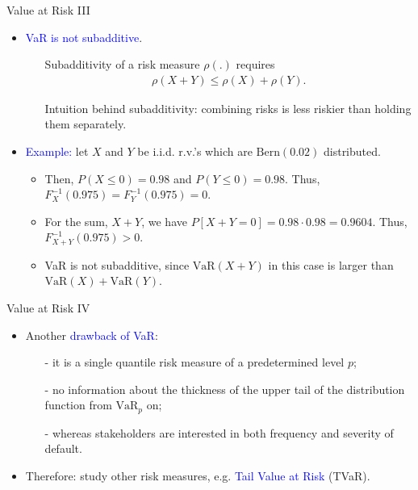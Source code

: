 \documentclass{beamer}
\begin{document}
\begin{frame}{Value at Risk III}
\begin{itemize}
\item \textcolor{blue}{VaR is not subadditive}.
\begin{itemize}
\item[] Subadditivity of a risk measure $\rho(.)$ requires
\begin{eqnarray*}
\rho(X+Y) \leq \rho(X)+\rho(Y).
\end{eqnarray*}
\item[] Intuition behind subadditivity: combining risks is less riskier than holding them separately.
\end{itemize}
\vspace{0.3cm}
\item \textcolor{blue}{Example:} let $X$ and $Y$ be i.i.d. r.v.'s which are $\text{Bern}(0.02)$ distributed.
\begin{itemize}
\item Then, $P(X\leq 0) = 0.98$ and $P(Y\leq 0)=0.98$. Thus, $F_X^{-1}(0.975)=F_Y^{-1}(0.975)=0$.
\vspace{0.3cm}
\item For the sum, $X+Y$, we have $P[X+Y=0]=0.98 \cdot 0.98=0.9604$. Thus, $F_{X+Y}^{-1}(0.975)>0$.
\vspace{0.3cm}
\item VaR is not subadditive, since $\text{VaR}(X+Y)$ in this case is larger than $\text{VaR}(X)+\text{VaR}(Y)$.
\end{itemize}
\end{itemize}
\end{frame}

\begin{frame}{Value at Risk IV}
\begin{itemize}
\item Another \textcolor{blue}{drawback of VaR}:
\vspace{0.3cm}
\begin{itemize}
\item[-] it is a single quantile risk measure of a predetermined level $p$;
\vspace{0.3cm}
\item[-] no information about the thickness of the upper tail of the distribution
function from $\text{VaR}_p$ on;
\vspace{0.3cm}
\item[-] whereas stakeholders are interested in both frequency and severity of default.
\end{itemize}
\vspace{0.3cm}
\item Therefore: study other risk measures, e.g. \textcolor{blue}{Tail Value at Risk} (TVaR).
\end{itemize}
\end{frame}
\end{document}
